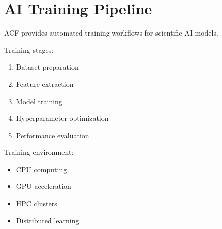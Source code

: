 \section{AI Training Pipeline}


ACF provides automated training workflows for scientific AI
models.



Training stages:


\begin{enumerate}

\item Dataset preparation

\item Feature extraction

\item Model training

\item Hyperparameter optimization

\item Performance evaluation

\end{enumerate}



Training environment:


\begin{itemize}

\item CPU computing

\item GPU acceleration

\item HPC clusters

\item Distributed learning

\end{itemize}

